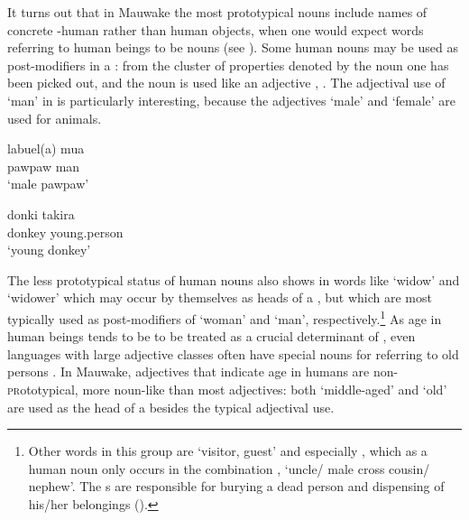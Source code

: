 It turns out that in Mauwake the most prototypical nouns include names of concrete -human rather than human objects, when one would expect words referring to human beings to be nouns  (see \citealt[192]{Taylor1989}). Some human nouns may be used as post-modifiers in a : from the cluster of properties denoted by the noun one has been picked out, and the noun is used like an adjective , . The adjectival use of  `man' in  is particularly interesting, because the adjectives  `male' and  `female' are used for animals.

\ea%
\label{ex:3:x23}
\gll labuel(a) mua \\
pawpaw man\\
\glt`male pawpaw'
\z

\ea%
\label{ex:3:x24}
\gll donki takira \\
donkey young.person\\
\glt`young donkey'
\z

The less prototypical status of human nouns also shows in words like  `widow' and  `widower' which may occur by themselves as heads of a , but which are most typically used as post-modifiers of  `woman' and  `man', respectively.\footnote{Other words in this group are \textbf{\textit{} }`visitor, guest' and especially , which as a human noun only occurs in the combination , `uncle/ male cross cousin/ nephew'. The s are responsible for burying a dead person and dispensing of his/her belongings ().} As age in human beings tends to be to be treated as a crucial determinant of , even languages with large adjective classes often have special nouns for referring to old persons \citep[368]{Wierzbicka1986}. In Mauwake, adjectives that indicate age in humans are non-\textsc{pr}ototypical, more noun-like than most adjectives: both  `middle-aged' and  `old' are used as the head of a  besides the typical adjectival use.

